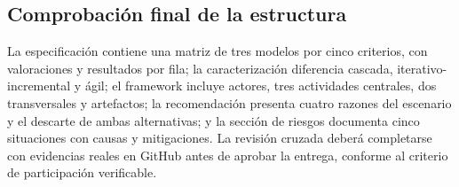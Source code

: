 \documentclass[conference,onecolumn]{IEEEtran}
\begin{document}
\subsection{Comprobación final de la estructura}

La especificación contiene una matriz de tres modelos por cinco criterios, con valoraciones y resultados por fila; la caracterización diferencia cascada, iterativo-incremental y ágil; el framework incluye actores, tres actividades centrales, dos transversales y artefactos; la recomendación presenta cuatro razones del escenario y el descarte de ambas alternativas; y la sección de riesgos documenta cinco situaciones con causas y mitigaciones. La revisión cruzada deberá completarse con evidencias reales en GitHub antes de aprobar la entrega, conforme al criterio de participación verificable.

\printbibliography[title={Referencias}]
\end{document}

